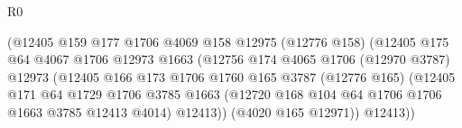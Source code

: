 \begin{lexlean}{R0}
\begin{coremodule}
                                        (@12405
                                          @159
                                          @177
                                          @1706
                                          @4069
                                          @158
                                          @12975
                                          (@12776 @158)
                                          (@12405
                                            @175
                                            @64
                                            @4067
                                            @1706
                                            @12973
                                            @1663
                                            (@12756
                                              @174
                                              @4065
                                              @1706
                                              (@12970 @3787)
                                              @12973
                                              (@12405
                                                @166
                                                @173
                                                @1706
                                                @1760
                                                @165
                                                @3787
                                                (@12776 @165)
                                                (@12405
                                                  @171
                                                  @64
                                                  @1729
                                                  @1706
                                                  @3785
                                                  @1663
                                                  (@12720
                                                    @168
                                                    @104
                                                    @64
                                                    @1706
                                                    @1706
                                                    @1663
                                                    @3785
                                                    @12413
                                                    @4014)
                                                  @12413))
                                              (@4020 @165 @12971))
                                            @12413))

\end{coremodule}
\end{lexlean}
